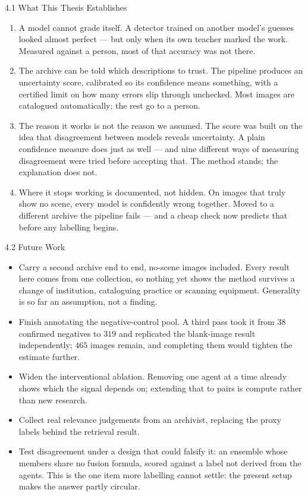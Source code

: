 \documentclass[aspectratio=169,11pt]{beamer}
\begin{document}
\begin{frame}{4.1 What This Thesis Establishes}
\footnotesize
\begin{enumerate}
    \setlength\itemsep{8pt}
    \item A model cannot grade itself. A detector trained on another model's guesses looked almost perfect --- but only when its own teacher marked the work. Measured against a person, most of that accuracy was not there.
    \item The archive can be told which descriptions to trust. The pipeline produces an uncertainty score, calibrated so its confidence means something, with a certified limit on how many errors slip through unchecked. Most images are catalogued automatically; the rest go to a person.
    \item The reason it works is not the reason we assumed. The score was built on the idea that disagreement between models reveals uncertainty. A plain confidence measure does just as well --- and nine different ways of measuring disagreement were tried before accepting that. The method stands; the explanation does not.
    \item Where it stops working is documented, not hidden. On images that truly show no scene, every model is confidently wrong together. Moved to a different archive the pipeline fails --- and a cheap check now predicts that before any labelling begins.
\end{enumerate}
\end{frame}

\begin{frame}{4.2 Future Work}
\footnotesize
\begin{itemize}
  \setlength\itemsep{4pt}
  \item Carry a second archive end to end, no-scene images included. Every result here comes from one collection, so nothing yet shows the method survives a change of institution, cataloguing practice or scanning equipment. Generality is so far an assumption, not a finding.
  \item Finish annotating the negative-control pool. A third pass took it from $38$ confirmed negatives to $319$ and replicated the blank-image result independently; $465$ images remain, and completing them would tighten the estimate further.
  \item Widen the interventional ablation. Removing one agent at a time already shows which the signal depends on; extending that to pairs is compute rather than new research.
  \item Collect real relevance judgements from an archivist, replacing the proxy labels behind the retrieval result.
  \item Test disagreement under a design that could falsify it: an ensemble whose members share no fusion formula, scored against a label not derived from the agents. This is the one item more labelling cannot settle: the present setup makes the answer partly circular.
\end{itemize}
\end{frame}
\end{document}

